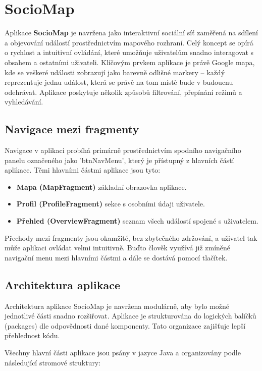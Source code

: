 \chapter{SocioMap}

Aplikace \textbf{SocioMap} je navržena jako interaktivní sociální síť zaměřená na sdílení a objevování událostí prostřednictvím mapového rozhraní. Celý koncept se opírá o rychlost a intuitivní ovládání, které umožňuje uživatelům snadno interagovat s obsahem a ostatními uživateli. Klíčovým prvkem aplikace je právě Google mapa, kde se veškeré události zobrazují jako barevně odlišné markery – každý reprezentuje jednu událost, která se právě na tom místě bude v budoucnu odehrávat. Aplikace poskytuje několik způsobů filtrování, přepínání režimů a vyhledávání.

\section*{Navigace mezi fragmenty}

Navigace v aplikaci probíhá primárně prostřednictvím spodního navigačního panelu označeného jako 'btnNavMenu', který je přístupný z  hlavních částí aplikace. Těmi hlavními částmi aplikace jsou tyto:
\begin{itemize}
	\item \textbf{Mapa (MapFragment)} základní obrazovka aplikace.
	\item \textbf{Profil (ProfileFragment)} sekce s osobními údaji uživatele.
	\item \textbf{Přehled (OverviewFragment)} seznam všech událostí spojené s uživatelem.
\end{itemize}

Přechody mezi fragmenty jsou okamžité, bez zbytečného zdržování, a uživatel tak může aplikaci ovládat velmi intuitivně. Buďto člověk využívá již zmíněné navigační menu mezi hlavními částmi a dále se dostává pomocí tlačítek.
\cite{YouTubeTutorial}


\section{Architektura aplikace}

Architektura aplikace SocioMap je navržena modulárně, aby bylo možné jednotlivé části snadno rozšiřovat. Aplikace je strukturována do logických balíčků (packages) dle odpovědnosti dané komponenty. Tato organizace zajišťuje lepší přehlednost kódu.

Všechny hlavní části aplikace jsou psány v jazyce Java a organizovány podle následující stromové struktury:

